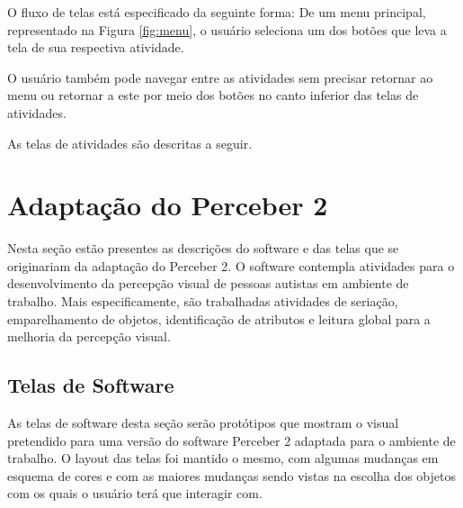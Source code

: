 \documentclass[12pt]{article}
\begin{document}
O fluxo de telas está especificado da seguinte forma: De um menu principal, representado na Figura \ref{fig:menu}, o usuário seleciona um dos botões que leva a tela de sua respectiva atividade.

O usuário também pode navegar entre as atividades sem precisar retornar ao menu ou retornar a este por meio dos botões no canto inferior das telas de atividades.

As telas de atividades são descritas a seguir.



\section{Adaptação do Perceber 2}

Nesta seção estão presentes as descrições do software e das telas que se originariam da adaptação do Perceber 2. O software contempla atividades para o desenvolvimento da percepção visual de pessoas autistas em ambiente de trabalho. Mais especificamente, são trabalhadas atividades de seriação, emparelhamento de objetos, identificação de atributos e leitura global para a melhoria da percepção visual.

\subsection{Telas de Software}

As telas de software desta seção serão protótipos que mostram o visual pretendido para uma versão do software Perceber 2 adaptada para o ambiente de trabalho. O layout das telas foi mantido o mesmo, com algumas mudanças em esquema de cores e com as maiores mudanças sendo vistas na escolha dos objetos com os quais o usuário terá que interagir com.
\end{document}
